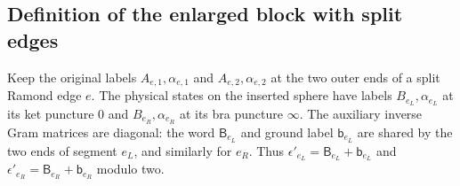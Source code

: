 \documentclass[11pt]{article}
\numberwithin{equation}{section}
\begin{document}
\subsection{Definition of the enlarged block with split edges}

Keep the original labels $A_{e,1},\alpha_{e,1}$ and
$A_{e,2},\alpha_{e,2}$ at the two outer ends of a split Ramond edge $e$.
The physical states on the inserted sphere have labels
$B_{e_L},\alpha_{e_L}$ at its ket puncture $0$ and
$B_{e_R},\alpha_{e_R}$ at its bra puncture $\infty$.
The auxiliary inverse Gram matrices are diagonal: the word
$\mathsf B_{e_L}$ and ground label $\mathsf b_{e_L}$ are shared by
the two ends of segment $e_L$, and similarly for $e_R$. Thus
$\epsilon'_{e_L}=\mathsf B_{e_L}+\mathsf b_{e_L}$ and
$\epsilon'_{e_R}=\mathsf B_{e_R}+\mathsf b_{e_R}$ modulo two.
\end{document}
